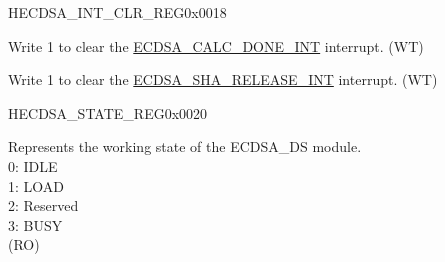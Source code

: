 \begin{register}{H}{ECDSA\_INT\_CLR\_REG}{0x0018}\label{regdesc:ECDSAINTCLRREG}
%
%
%
\regnewline%
\begin{regdesc}\begin{reglist}
\label{fielddesc:ECDSACALCDONEINTCLR}\item [ECDSA\_CALC\_DONE\_INT\_CLR] Write 1 to clear the \hyperref[int:ECDSACALCDONEINT]{ECDSA\_CALC\_DONE\_INT} interrupt. (WT)
\label{fielddesc:ECDSASHARELEASEINTCLR}\item [ECDSA\_SHA\_RELEASE\_INT\_CLR] Write 1 to clear the \hyperref[int:ECDSASHARELEASEINT]{ECDSA\_SHA\_RELEASE\_INT} interrupt. (WT)
\end{reglist}\end{regdesc}
\end{register}


\begin{register}{H}{ECDSA\_STATE\_REG}{0x0020}\label{regdesc:ECDSASTATEREG}
%
%
\regnewline%
\begin{regdesc}\begin{reglist}
\label{fielddesc:ECDSABUSY}\item [ECDSA\_BUSY] Represents the working state of the ECDSA\_DS module.\\
0: IDLE\\
1: LOAD\\
2: Reserved\\
3: BUSY\\
(RO)
\end{reglist}\end{regdesc}
\end{register}



